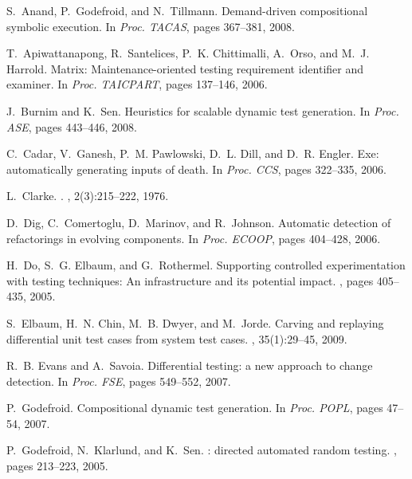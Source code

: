 \documentclass{sig-alternate}
\begin{document}
\vspace{-0.2 cm}
\begin{thebibliography}{10}
\begin{scriptsize}

S.~Anand, P.~Godefroid, and N.~Tillmann.
\newblock Demand-driven compositional symbolic execution.
\newblock In {\em Proc. TACAS}, pages 367--381, 2008.

T.~Apiwattanapong, R.~Santelices, P.~K. Chittimalli, A.~Orso, and M.~J.
  Harrold.
\newblock Matrix: Maintenance-oriented testing requirement identifier and
  examiner.
\newblock In {\em Proc. TAICPART}, pages 137--146, 2006.

J.~Burnim and K.~Sen.
\newblock Heuristics for scalable dynamic test generation.
\newblock In {\em Proc. ASE}, pages 443--446, 2008.

C.~Cadar, V.~Ganesh, P.~M. Pawlowski, D.~L. Dill, and D.~R. Engler.
\newblock Exe: automatically generating inputs of death.
\newblock In {\em Proc. CCS}, pages 322--335, 2006.

L.~Clarke.
.
, 2(3):215--222, 1976.

D.~Dig, C.~Comertoglu, D.~Marinov, and R.~Johnson.
\newblock Automatic detection of refactorings in evolving components.
\newblock In {\em Proc. ECOOP}, pages 404--428, 2006.

H.~Do, S.~G. Elbaum, and G.~Rothermel.
\newblock Supporting controlled experimentation with testing techniques: An
  infrastructure and its potential impact.
, pages 405--435, 2005.

S.~Elbaum, H.~N. Chin, M.~B. Dwyer, and M.~Jorde.
\newblock Carving and replaying differential unit test cases from system test
  cases.
, 35(1):29--45, 2009.

R.~B. Evans and A.~Savoia.
\newblock Differential testing: a new approach to change detection.
\newblock In {\em Proc. FSE}, pages 549--552, 2007.

P.~Godefroid.
\newblock Compositional dynamic test generation.
\newblock In {\em Proc. POPL}, pages 47--54, 2007.

P.~Godefroid, N.~Klarlund, and K.~Sen.
: directed automated random testing.
, pages 213--223, 2005.


\end{scriptsize}
\end{thebibliography}
\end{document}
